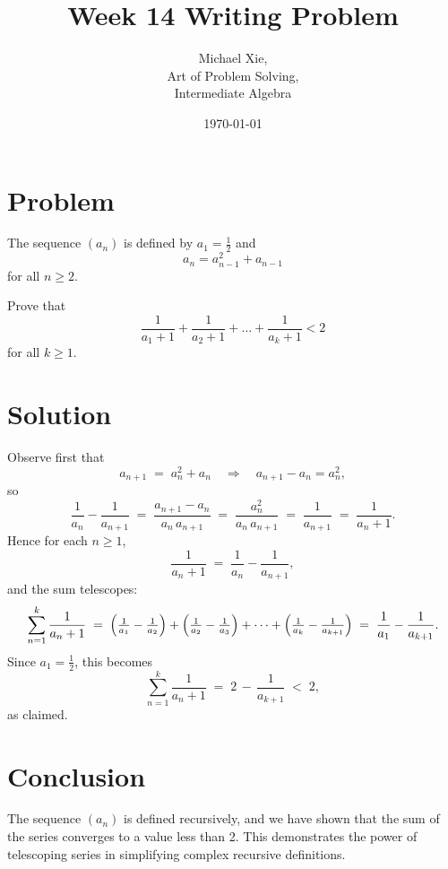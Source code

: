 \documentclass{article}
\title{Week 14 Writing Problem}
\author{Michael Xie, \\
        Art of Problem Solving, \\
        Intermediate Algebra}
\date{\today}
\begin{document}
\maketitle

\section*{Problem}
The sequence $(a_n)$ is defined by $a_1 = \frac{1}{2}$ and
\[
  a_n = a_{n - 1}^2 + a_{n - 1}
\]
for all $n \ge 2.$

Prove that
\[
  \frac{1}{a_1 + 1} + \frac{1}{a_2 + 1} + \dots + \frac{1}{a_k + 1} < 2
\]
for all $k \ge 1.$

\section*{Solution}
Observe first that
\[
  a_{n+1} \;=\; a_n^2 + a_n
  \quad\Longrightarrow\quad
  a_{n+1}-a_n = a_n^2,
\]
so
\[
  \frac1{a_n}-\frac1{a_{n+1}}
  \;=\;
  \frac{a_{n+1}-a_n}{a_n\,a_{n+1}}
  \;=\;
  \frac{a_n^2}{a_n\,a_{n+1}}
  \;=\;
  \frac1{a_{n+1}}
  \;=\;
  \frac1{a_n+1}.
\]
Hence for each $n\ge1$,
\[
  \frac1{a_n+1}
  \;=\;
  \frac1{a_n}-\frac1{a_{n+1}},
\]
and the sum telescopes:
\[
  \sum_{n=1}^k \frac1{a_n+1}
  \;=\;
  \Bigl(\tfrac1{a_1}-\tfrac1{a_2}\Bigr)
  +\Bigl(\tfrac1{a_2}-\tfrac1{a_3}\Bigr)
  +\cdots+
  \Bigl(\tfrac1{a_k}-\tfrac1{a_{k+1}}\Bigr)
  \;=\;
  \frac1{a_1}-\frac1{a_{k+1}}.
\]
Since $a_1=\tfrac12$, this becomes
\[
  \sum_{n=1}^k \frac1{a_n+1}
  \;=\;
  2 \,-\, \frac1{a_{k+1}}
  \;<\;
  2,
\]
as claimed.

\section*{Conclusion}
The sequence $(a_n)$ is defined recursively, and we have shown that the sum of the series converges to a value less than 2. This demonstrates the power of telescoping series in simplifying complex recursive definitions.
\end{document}
